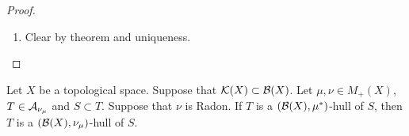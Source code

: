 \documentclass{book}
\begin{document}
\begin{proof}
\begin{enumerate}
			The previous exercise implies that 
			\begin{align*}
				\nu_{\mu}^{\perp}|_{E_n} 
				& = {\nu|_{E_n}}_{\mu|_{E_n}}^{\perp} \\
				& \perp \mu|_{E_n}
			\end{align*}
			Since for each $n \in \N$, $E_n$ is closed, $(E_n)_{n \in \N} \subset \MB(X)$.  implies that $\nu_{\mu}^{\perp} \perp \mu$.
			\item Clear by theorem and uniqueness. \\
		\end{enumerate}
	\end{proof}



	\begin{ex} 
		Let $X$ be a topological space. Suppose that $\mathcal{K}(X) \subset \mathcal{B}(X)$. Let $\mu, \nu \in M_+(X)$, $T \in \mathcal{A}_{\nu_{\mu}}$ and $S \subset T$. Suppose that $\nu$ is Radon. If $T$ is a $(\mathcal{B}(X), \mu^*)$-hull of $S$, then $T$ is a $(\mathcal{B}(X), \nu_{\mu})$-hull of $S$.
	\end{ex}
\end{document}
